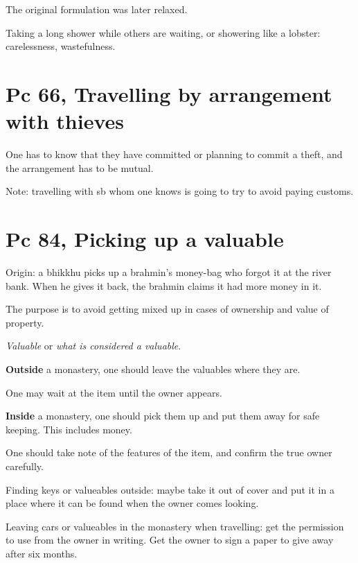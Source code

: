 The original formulation was later relaxed.

Taking a long shower while others are waiting, or showering like a
lobster: carelessness, wastefulness.

\section{Pc 66, Travelling by arrangement with thieves}

One has to know that they have committed or planning to commit a theft,
and the arrangement has to be mutual.

Note: travelling with sb whom one knows is going to try to avoid paying
customs.

\section{Pc 84, Picking up a valuable}

Origin: a bhikkhu picks up a brahmin's money-bag who forgot it at the
river bank. When he gives it back, the brahmin claims it had more money
in it.

The purpose is to avoid getting mixed up in cases of ownership and value
of property.

\emph{Valuable} or \emph{what is considered a valuable}.

\textbf{Outside} a monastery, one should leave the valuables where they
are.

One may wait at the item until the owner appears.

\textbf{Inside} a monastery, one should pick them up and put them away
for safe keeping. This includes money.

One should take note of the features of the item, and confirm the true
owner carefully.

Finding keys or valueables outside: maybe take it out of cover and put
it in a place where it can be found when the owner comes looking.

Leaving cars or valueables in the monastery when travelling: get the
permission to use from the owner in writing. Get the owner to sign a
paper to give away after six months.

